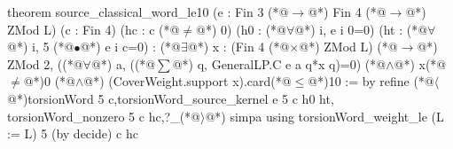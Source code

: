 theorem source_classical_word_le10 (e : Fin 3 (*@$\to$@*) Fin 4 (*@$\to$@*) ZMod L)
    (c : Fin 4) (hc : c (*@$\ne$@*) 0) (h0 : (*@$\forall$@*) i, e i 0=0)
    (ht : (*@$\forall$@*) i, 5 (*@$\bullet$@*) e i c=0) :
    (*@$\exists$@*) x : (Fin 4 (*@$\times$@*) ZMod L) (*@$\to$@*) ZMod 2,
      ((*@$\forall$@*) a, ((*@$\sum$@*) q, GeneralLP.C e a q*x q)=0) (*@$\land$@*) x(*@$\ne$@*)0 (*@$\land$@*)
      (CoverWeight.support x).card(*@$\le$@*)10 := by
  refine (*@$\langle$@*)torsionWord 5 c,torsionWord_source_kernel e 5 c h0 ht,
    torsionWord_nonzero 5 c hc,?_(*@$\rangle$@*)
  simpa using torsionWord_weight_le (L := L) 5 (by decide) c hc
